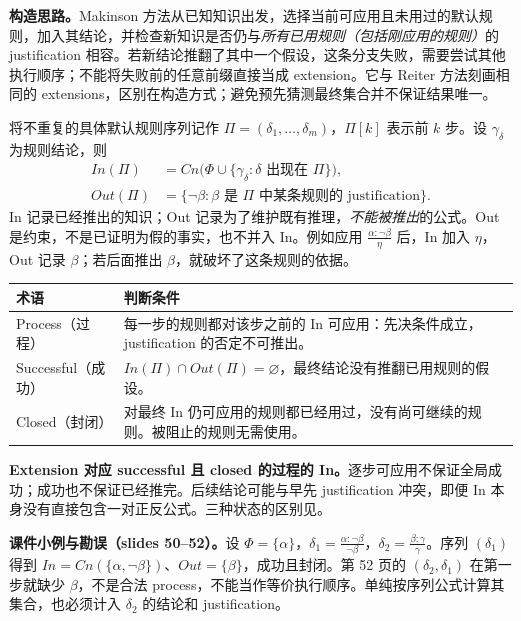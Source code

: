 
\textbf{构造思路。}Makinson 方法从已知知识出发，选择当前可应用且未用过的默认规则，加入其结论，并检查新知识是否仍与\emph{所有已用规则（包括刚应用的规则）}的 justification 相容。若新结论推翻了其中一个假设，这条分支失败，需要尝试其他执行顺序；不能将失败前的任意前缀直接当成 extension。它与 Reiter 方法刻画相同的 extensions，区别在构造方式；避免预先猜测最终集合并不保证结果唯一。

将不重复的具体默认规则序列记作 $\Pi=(\delta_1,\ldots,\delta_m)$，$\Pi[k]$ 表示前 $k$ 步。设 $\gamma_\delta$ 为规则结论，则
\begin{align*}
 In(\Pi)&=Cn\bigl(\Phi\cup\{\gamma_\delta:\delta\text{ 出现在 }\Pi\}\bigr),\\
 Out(\Pi)&=\{\neg\beta:\beta\text{ 是 }\Pi\text{ 中某条规则的 justification}\}.
\end{align*}
In 记录已经推出的知识；Out 记录为了维护既有推理，\emph{不能被推出}的公式。Out 是约束，不是已证明为假的事实，也不并入 In。例如应用 $\frac{\alpha:\neg\beta}{\eta}$ 后，In 加入 $\eta$，Out 记录 $\beta$；若后面推出 $\beta$，就破坏了这条规则的依据。

\begin{center}
\small
\begin{tabularx}{\textwidth}{@{}lX@{}}
\toprule
术语 & 判断条件 \\
\midrule
Process（过程） & 每一步的规则都对该步之前的 In 可应用：先决条件成立，justification 的否定不可推出。\\
Successful（成功） & $In(\Pi)\cap Out(\Pi)=\varnothing$，最终结论没有推翻已用规则的假设。\\
Closed（封闭） & 对最终 In 仍可应用的规则都已经用过，没有尚可继续的规则。被阻止的规则无需使用。\\
\bottomrule
\end{tabularx}
\end{center}

\textbf{Extension 对应 successful 且 closed 的过程的 In。}逐步可应用不保证全局成功；成功也不保证已经推完。后续结论可能与早先 justification 冲突，即便 In 本身没有直接包含一对正反公式。三种状态的区别见。

\textbf{课件小例与勘误（slides 50--52）。}设 $\Phi=\{\alpha\}$，$\delta_1=\frac{\alpha:\neg\beta}{\neg\beta}$，$\delta_2=\frac{\beta:\gamma}{\gamma}$。序列 $(\delta_1)$ 得到 $In=Cn(\{\alpha,\neg\beta\})$、$Out=\{\beta\}$，成功且封闭。第 52 页的 $(\delta_2,\delta_1)$ 在第一步就缺少 $\beta$，不是合法 process，不能当作等价执行顺序。单纯按序列公式计算其集合，也必须计入 $\delta_2$ 的结论和 justification。

